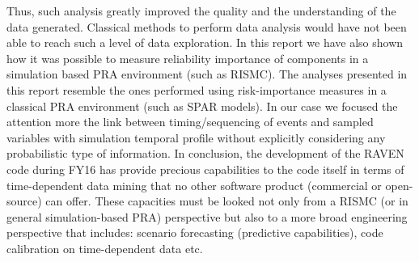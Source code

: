Thus, such analysis greatly improved the quality and the understanding of the data generated. 
Classical methods to perform data analysis would have not been able to reach such a level of 
data exploration.
In this report we have also shown how it was possible to measure reliability importance of 
components in a simulation based PRA environment (such as RISMC). The analyses presented 
in this report resemble the ones performed using risk-importance measures in a classical 
PRA environment (such as SPAR models). In our case we focused the attention more the link 
between timing/sequencing of events and sampled variables with simulation temporal profile 
without explicitly considering any probabilistic type of information.
In conclusion, the development of the RAVEN code during FY16 has provide precious capabilities 
to the code itself in terms of time-dependent data mining that no other software product 
(commercial or open-source) can offer. These capacities must be looked not only from a RISMC 
(or in general simulation-based PRA) perspective but also to a more broad engineering 
perspective that includes: scenario forecasting (predictive capabilities), code calibration 
on time-dependent data etc. 


